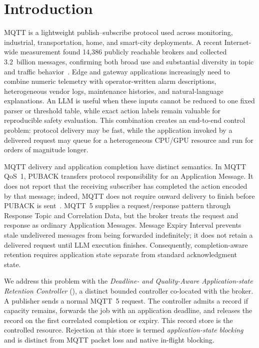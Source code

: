 \section{Introduction}
\label{sec:introduction}

MQTT is a lightweight publish--subscribe protocol used across monitoring, industrial, transportation, home, and smart-city deployments. A recent Internet-wide measurement found 14,386 publicly reachable brokers and collected 3.2~billion messages, confirming both broad use and substantial diversity in topic and traffic behavior~\cite{innamorati2026pulse}. Edge and gateway applications increasingly need to combine numeric telemetry with operator-written alarm descriptions, heterogeneous vendor logs, maintenance histories, and natural-language explanations. An LLM is useful when these inputs cannot be reduced to one fixed parser or threshold table, while exact action labels remain valuable for reproducible safety evaluation. This combination creates an end-to-end control problem: protocol delivery may be fast, while the application invoked by a delivered request may queue for a heterogeneous CPU/GPU resource and run for orders of magnitude longer.

MQTT delivery and application completion have distinct semantics. In MQTT QoS~1, PUBACK transfers protocol responsibility for an Application Message. It does not report that the receiving subscriber has completed the action encoded by that message; indeed, MQTT does not require onward delivery to finish before PUBACK is sent~\cite{oasis2019mqtt}. MQTT~5 supplies a request/response pattern through Response Topic and Correlation Data, but the broker treats the request and response as ordinary Application Messages. Message Expiry Interval prevents stale undelivered messages from being forwarded indefinitely; it does not retain a delivered request until LLM execution finishes. Consequently, completion-aware retention requires application state separate from standard acknowledgment state.

We address this problem with the \emph{Deadline- and Quality-Aware Application-state Retention Controller} (\method{}), a distinct bounded controller co-located with the broker. A publisher sends a normal MQTT~5 request. The controller admits a record if capacity remains, forwards the job with an application deadline, and releases the record on the first correlated completion or expiry. This record store is the controlled resource. Rejection at this store is termed \emph{application-state blocking} and is distinct from MQTT packet loss and native in-flight blocking.

